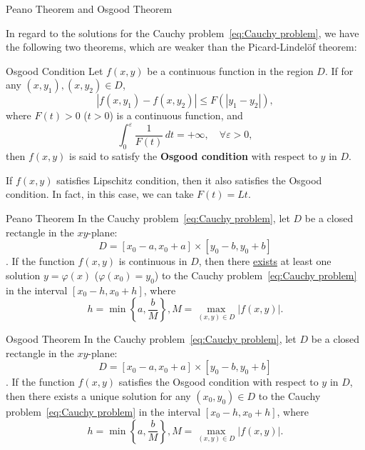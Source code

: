\documentclass[11pt]{../../TexTemplate/elegantbook}
\begin{document}
\begin{proposition}
    
\end{proposition}

\begin{leftbarTitle}{Peano Theorem and Osgood Theorem}\end{leftbarTitle}
In regard to the solutions for the Cauchy problem~\eqref{eq:Cauchy problem},
we have the following two theorems, which are weaker than the Picard-Lindelöf theorem:

\begin{definition}{Osgood Condition}
    Let \(f(x, y)\) be a continuous function in the region \(D\).
    If for any \((x, y_1), (x, y_2) \in D\), 
    \[
    |f(x, y_1) - f(x, y_2)| \leqslant  F(|y_1 - y_2|),
    \]
    where \(F(t) > 0\) (\(t > 0\)) is a continuous function, and
    \[
    \int_{0}^{\varepsilon} \frac{1}{F(t)} \, dt = +\infty, \quad \forall \varepsilon > 0,
    \]
    then \(f(x, y)\) is said to satisfy the \textbf{Osgood condition} with respect to \(y\) in \(D\).
\end{definition}

\begin{remark}
    If \(f(x, y)\) satisfies Lipschitz condition, then it also satisfies the Osgood condition.
    In fact, in this case, we can take \(F(t) = Lt\).
\end{remark}

\begin{theorem}{Peano Theorem}
    In the Cauchy problem~\eqref{eq:Cauchy problem},
    let \(D\) be a closed rectangle in the \(xy\)-plane: 
    \[
    D = [x_{0}-a, x_{0}+a] \times [y_{0}-b, y_{0}+b]
    \].
    If the function \(f(x, y)\) is continuous in \(D\),
    then there \underline{exists} at least one solution \(y = \varphi(x)\) (\(\varphi(x_0) = y_0\)) 
    to the Cauchy problem~\eqref{eq:Cauchy problem}
    in the interval \([x_{0}-h, x_{0}+h]\), where
    \[
    h = \min\left\{a, \frac{b}{M}\right\}, M = \max_{(x, y) \in D} |f(x, y)|.
    \]
\end{theorem}

\begin{theorem}{Osgood Theorem}
    In the Cauchy problem~\eqref{eq:Cauchy problem},
    let \(D\) be a closed rectangle in the \(xy\)-plane: 
    \[
    D = [x_{0}-a, x_{0}+a] \times [y_{0}-b, y_{0}+b]
    \].
    If the function \(f(x, y)\) satisfies the Osgood condition with respect to \(y\) in \(D\),
    then there exists a unique solution for any \((x_{0}, y_{0}) \in D\)
    to the Cauchy problem~\eqref{eq:Cauchy problem}
    in the interval \([x_{0}-h, x_{0}+h]\), where
    \[
    h = \min\left\{a, \frac{b}{M}\right\}, M = \max_{(x, y) \in D} |f(x, y)|.
    \]
\end{theorem}
\end{document}
